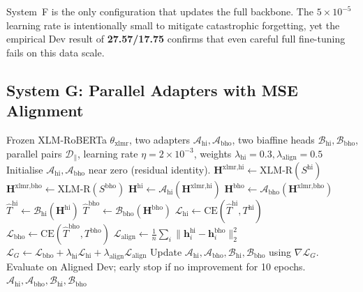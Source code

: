 \documentclass[12pt,a4paper,oneside]{report}
\newcommand{\xlmr}{XLM-RoBERTa}
\begin{document}
System~F is the only configuration that updates the full backbone. The
$5\times 10^{-5}$ learning rate is intentionally small to mitigate catastrophic
forgetting, yet the empirical Dev result of \textbf{27.57/17.75} confirms that
even careful full fine-tuning fails on this data scale.

\subsection{System G: Parallel Adapters with MSE Alignment}

\begin{algorithm}[ht]
\caption{System G training (frozen XLM-R + parallel adapters + MSE).}
\label{alg:system_g}
\begin{algorithmic}[1]
\Require Frozen \xlmr{} $\theta_{\text{xlmr}}$, two adapters
         $\mathcal{A}_{\text{hi}}, \mathcal{A}_{\text{bho}}$, two biaffine heads
         $\mathcal{B}_{\text{hi}}, \mathcal{B}_{\text{bho}}$, parallel pairs
         $\mathcal{D}_\parallel$, learning rate $\eta = 2\times 10^{-3}$,
         weights $\lambda_{\text{hi}} = 0.3, \lambda_{\text{align}} = 0.5$
\State Initialise $\mathcal{A}_{\text{hi}}, \mathcal{A}_{\text{bho}}$ near zero (residual identity).
    \State $\mathbf{H}^{\text{xlmr,hi}} \gets \text{XLM-R}(S^{\text{hi}})$
    \State $\mathbf{H}^{\text{xlmr,bho}} \gets \text{XLM-R}(S^{\text{bho}})$
    \State $\mathbf{H}^{\text{hi}} \gets \mathcal{A}_{\text{hi}}(\mathbf{H}^{\text{xlmr,hi}})$
    \State $\mathbf{H}^{\text{bho}} \gets \mathcal{A}_{\text{bho}}(\mathbf{H}^{\text{xlmr,bho}})$
    \State $\hat{T}^{\text{hi}} \gets \mathcal{B}_{\text{hi}}(\mathbf{H}^{\text{hi}})$
    \State $\hat{T}^{\text{bho}} \gets \mathcal{B}_{\text{bho}}(\mathbf{H}^{\text{bho}})$
    \State $\mathcal{L}_{\text{hi}} \gets \text{CE}(\hat{T}^{\text{hi}}, T^{\text{hi}})$
    \State $\mathcal{L}_{\text{bho}} \gets \text{CE}(\hat{T}^{\text{bho}}, T^{\text{bho}})$
    \State $\mathcal{L}_{\text{align}} \gets \frac{1}{n}\sum_i \|\mathbf{h}^{\text{hi}}_i - \mathbf{h}^{\text{bho}}_i\|_2^2$
    \State $\mathcal{L}_G \gets \mathcal{L}_{\text{bho}} + \lambda_{\text{hi}}\mathcal{L}_{\text{hi}} + \lambda_{\text{align}}\mathcal{L}_{\text{align}}$
    \State Update $\mathcal{A}_{\text{hi}}, \mathcal{A}_{\text{bho}}, \mathcal{B}_{\text{hi}}, \mathcal{B}_{\text{bho}}$ using $\nabla \mathcal{L}_G$.
  \EndFor
  \State Evaluate on Aligned Dev; early stop if no improvement for 10 epochs.
\EndFor
\State \Return $\mathcal{A}_{\text{hi}}, \mathcal{A}_{\text{bho}}, \mathcal{B}_{\text{hi}}, \mathcal{B}_{\text{bho}}$
\end{algorithmic}
\end{algorithm}
\end{document}
